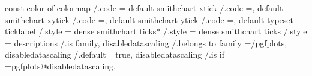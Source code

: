 {{{{{const color of colormap                      /.code                                                                                    ={%
default smithchart xtick                     /.code                                                                                    =,                                                                                                                  
default smithchart xytick                    /.code                                                                                    =,                                                                                                                  
default smithchart ytick                     /.code                                                                                    =,                                                                                                                  
default typeset ticklabel                    /.style                                                                                   ={                                                                                                                  
dense smithchart ticks*                      /.style                                                                                   ={                                                                                                                  
dense smithchart ticks                       /.style                                                                                   ={                                                                                                                  
descriptions                                 /.is family,                                                                        
disabledatascaling                           /.belongs to family                                                                       =/pgfplots,                                                                                                         
disabledatascaling                           /.default                                                                                 =true,                                                                                                              
disabledatascaling                           /.is if                                                                                   =pgfplots@disabledatascaling,                                                                                       
}}}}}}}}}
